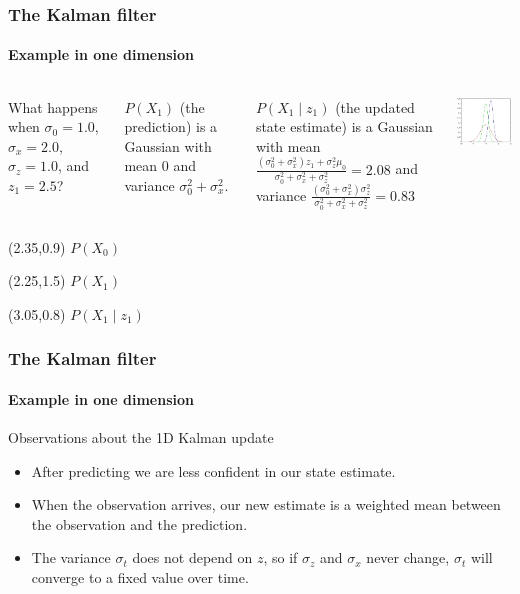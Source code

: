 \documentclass[aspectratio=169]{beamer}
\begin{document}
\begin{frame}
\frametitle{The Kalman filter}
\framesubtitle{Example in one dimension}

\begin{columns}
\column{5cm}

What happens when $\sigma_0=1.0$, $\sigma_x=2.0,$
$\sigma_z=1.0$, and $z_1=2.5$?

\medskip
$P(X_1)$ (the prediction) is a Gaussian with mean 0 and variance
$\sigma_0^2+\sigma_x^2$.

\medskip
$P(X_1 \mid z_1)$ (the updated state estimate) is a Gaussian with mean
$\frac{(\sigma_0^2+\sigma_x^2)z_1+\sigma_z^2\mu_0}
{\sigma_0^2+\sigma_x^2+\sigma_z^2} = 2.08$ and variance
$\frac{(\sigma_0^2+\sigma_x^2)\sigma_z^2}
{\sigma_0^2+\sigma_x^2+\sigma_z^2}=0.83$

\column{6cm}
\includegraphics[width=6cm]{kalman-fig.jpg}
\end{columns}

\begin{textblock}{3}(2.35,0.9)
$P(X_0)$
\end{textblock}
\begin{textblock}{3}(2.25,1.5)
$P(X_1)$
\end{textblock}
\begin{textblock}{3}(3.05,0.8)
$P(X_1 \mid z_1)$
\end{textblock}

\end{frame}

\begin{frame}
\frametitle{The Kalman filter}
\framesubtitle{Example in one dimension}

\begin{block}{Observations about the 1D Kalman update}
\begin{itemize}
\item After predicting we are \alert{less confident} in our state estimate.
\item When the observation arrives, our new estimate is a
      \alert{weighted mean} between the observation and the prediction.
\item The variance $\sigma_t$ does not depend on $z$, so if $\sigma_z$
      and $\sigma_x$ never change, $\sigma_t$ will converge to a fixed
      value over time.\end{itemize}
\end{block}

\end{frame}
\end{document}
